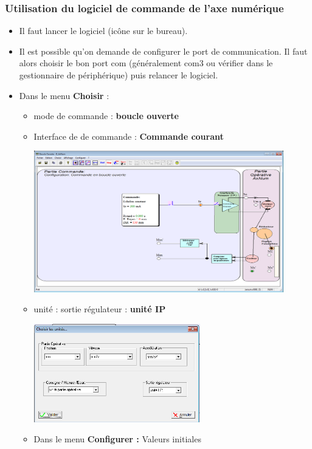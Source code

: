 \subsubsection{Utilisation du logiciel de commande de l'axe numérique}
\begin{itemize}
\item Il faut lancer le logiciel (icône sur le bureau).
\item Il est possible qu'on demande de configurer le port de communication. Il faut alors choisir le bon port com (généralement com3 ou vérifier dans le gestionnaire de périphérique) puis relancer le logiciel.
\item Dans le menu \textbf{Choisir} : 
\begin{itemize}
\item mode de commande : \textbf{boucle ouverte}
\item Interface de de commande : \textbf{Commande courant}
\begin{center}
\includegraphics[width=0.9\textwidth]{images/logiciel2.png}
\end{center} 
\item unité : sortie régulateur : \textbf{unité IP}
\begin{center}
\includegraphics[width=0.6\textwidth]{images/logiciel_unite.png}
\end{center}
\item Dans le menu \textbf{Configurer : } Valeurs initiales

\end{itemize}
\end{itemize}

